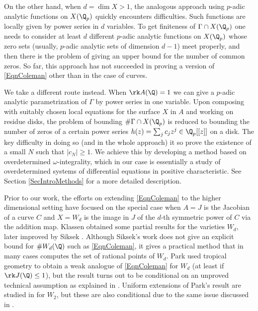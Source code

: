 On the other hand, when $d=\dim X>1$, the analogous approach using $p$-adic analytic functions on $X(\Q_p)$ quickly encounters difficulties. Such functions are locally given by power series in $d$ variables. To get finiteness of $\Gamma\cap X(\Q_p)$ one needs to consider at least $d$ different $p$-adic analytic functions on $X(\Q_p)$ whose zero sets (usually, $p$-adic analytic sets of dimension $d-1$) meet properly, and then there is the problem of giving an upper bound for the number of common zeros. So far, this approach has not succeeded in proving a version of \eqref{EqnColeman} other than in the case of curves.

We take a different route instead. When $\rk A(\Q)=1$ we can give a $p$-adic analytic parametrization of $\Gamma$ by power series in one variable. Upon composing with suitably chosen local equations for the surface $X$ in $A$ and working on residue disks, the problem of bounding $\# \Gamma\cap X(\Q_p)$ is reduced to bounding the number of zeros of a certain power series $h(z)=\sum_j c_jz^j\in \Q_p[[z]]$ on a disk. The key difficulty in doing so (and in the whole approach) it so prove the existence of a small $N$ such that $|c_N|\ge 1$.  We achieve this by developing a method based on overdetermined $\omega$-integrality, which in our case is essentially a study of overdetermined systems of differential equations in positive characteristic. See Section \ref{SecIntroMethods} for a more detailed description.






Prior to our work, the efforts on extending \eqref{EqnColeman} to the higher dimensional setting  have focused on the special case when $A=J$ is the Jacobian of a curve $C$  and $X=W_d$ is the image in $J$ of the $d$-th symmetric power of $C$ via the addition map.  Klassen \cite{Klassen} obtained some partial results for the varieties $W_d$, later improved by Siksek \cite{Siksek}. Although Siksek's work does not give an explicit  bound for $\# W_d(\Q)$ such as \eqref{EqnColeman}, it gives a practical method that in many cases computes the set of rational points of $W_d$.  Park \cite{Park} used tropical geometry to obtain a weak analogue of \eqref{EqnColeman} for $W_d$ (at least if $\rk J(\Q)\le 1$),  but the result turns out to be conditional on an unproved technical assumption as explained in \cite{GM}. Uniform extensions of Park's result are studied in \cite{VW} for $W_2$, but these are also conditional due to the same issue discussed in \cite{GM}.



